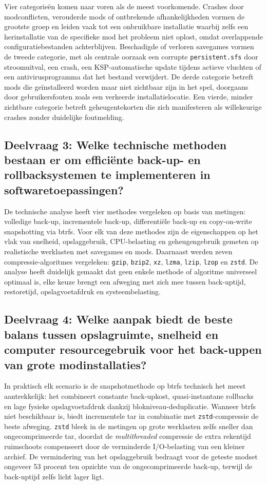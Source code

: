 Vier categorieën komen naar voren als de meest voorkomende. Crashes door modconflicten, verouderde mods of ontbrekende afhankelijkheden vormen de grootste groep en leiden vaak tot een onbruikbare installatie waarbij zelfs een herinstallatie van de specifieke mod het probleem niet oplost, omdat overlappende configuratiebestanden achterblijven. Beschadigde of verloren savegames vormen de tweede categorie, met als centrale oorzaak een corrupte \texttt{persistent.sfs} door stroomuitval, een crash, een KSP-automatische update tijdens actieve vluchten of een antivirusprogramma dat het bestand verwijdert. De derde categorie betreft mods die geïnstalleerd worden maar niet zichtbaar zijn in het spel, doorgaans door gebruikersfouten zoals een verkeerde installatielocatie. Een vierde, minder zichtbare categorie betreft geheugentekorten die zich manifesteren als willekeurige crashes zonder duidelijke foutmelding.

\subsection*{Deelvraag 3: Welke technische methoden bestaan er om efficiënte back-up- en rollbacksystemen te implementeren in softwaretoepassingen?}

De technische analyse heeft vier methodes vergeleken op basis van metingen: volledige back-up, incrementele back-up, differentiële back-up en copy-on-write snapshotting via btrfs. Voor elk van deze methodes zijn de eigenschappen op het vlak van snelheid, opslaggebruik, CPU-belasting en geheugengebruik gemeten op realistische werklasten met savegames en mods. Daarnaast werden zeven compressie-algoritmes vergeleken: \texttt{gzip}, \texttt{bzip2}, \texttt{xz}, \texttt{lzma}, \texttt{lzip}, \texttt{lzop} en \texttt{zstd}. De analyse heeft duidelijk gemaakt dat geen enkele methode of algoritme universeel optimaal is, elke keuze brengt een afweging met zich mee tussen back-uptijd, restoretijd, opslagvoetafdruk en systeembelasting.

\subsection*{Deelvraag 4: Welke aanpak biedt de beste balans tussen opslagruimte, snelheid en computer resourcegebruik voor het back-uppen van grote modinstallaties?}

In praktisch elk scenario is de snapshotmethode op btrfs technisch het meest aantrekkelijk: het combineert constante back-upkost, quasi-instantane rollbacks en lage fysieke opslagvoetafdruk dankzij blokniveau-deduplicatie. Wanneer btrfs niet beschikbaar is, biedt incrementele tar in combinatie met \texttt{zstd}-compressie de beste afweging. \texttt{zstd} bleek in de metingen op grote werklasten zelfs sneller dan ongecomprimeerde tar, doordat de \textit{multithreaded} compressie de extra rekentijd ruimschoots compenseert door de verminderde I/O-belasting van een kleiner archief. De vermindering van het opslaggebruik bedraagt voor de geteste modset ongeveer 53 procent ten opzichte van de ongecomprimeerde back-up, terwijl de back-uptijd zelfs licht lager ligt.

